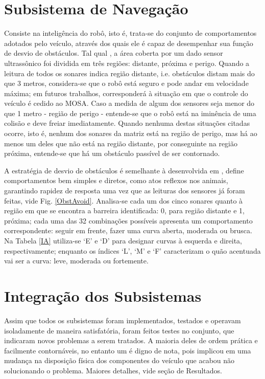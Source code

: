 \section{Subsistema de Navegação} %
Consiste na inteligência  do robô, isto é, trata-se do conjunto de comportamentos adotados pelo veículo, através dos quais ele é capaz de 
desempenhar sua função de desvio de obstáculos. %
Tal qual \cite{Artigo_3}, a área coberta por um dado sensor ultrassônico foi dividida em três regiões: distante, próxima e perigo.
Quando a leitura de todos os sonares indica região distante, i.e. obstáculos distam mais do que 3 metros, considera-se que o robô 
está seguro e pode andar em velocidade máxima; em futuros trabalhos, corresponderá à situação em que o controle do veículo é cedido ao MOSA.
Caso a medida de algum dos sensores seja menor do que 1 metro - região de perigo - entende-se que o robô está na iminência de uma colisão e deve 
freiar imediatamente.
Quando nenhuma destas situações citadas ocorre, isto é, nenhum dos sonares da matriz está na região de perigo, mas há ao menos um deles que não está 
na região distante, por conseguinte na região próxima, entende-se que há um obstáculo passível de ser contornado.

A estratégia de desvio de obstáculos é semelhante à desenvolvida em \cite{Artigo_1}, define comportamentos bem simples e diretos, como atos reflexos 
nos animais, garantindo rapidez de resposta uma vez que as leituras dos sensores já foram feitas, vide Fig. \ref{ObstAvoid}.
Analisa-se cada um dos cinco sonares quanto à região em que se encontra a barreira identificada: 0, para região distante e 1, próxima;
cada uma das 32 combinações possíveis apresenta um comportamento correspondente: seguir em frente, fazer uma curva aberta, moderada ou brusca.
Na Tabela \ref{IA} utiliza-se \textquoteleft E\textquoteright{} e  \textquoteleft D\textquoteright{} para designar curvas à esquerda e direita, 
respectivamente; enquanto os índices \textquoteleft L\textquoteright{},  \textquoteleft M\textquoteright{} e \textquoteleft F\textquoteright{} 
caracterizam o quão acentuada vai ser a curva: leve, moderada ou fortemente. %

\section{Integração dos Subsistemas}
Assim que todos os subsistemas foram implementados, testados e operavam isoladamente de maneira satisfatória, foram feitos testes no conjunto, que 
indicaram novos problemas a serem tratados. 
A maioria deles de ordem prática e facilmente contornáveis, no entanto um é digno de nota, pois implicou em uma mudança na disposição física dos 
componentes do veículo que acabou não solucionando o problema. Maiores detalhes, vide seção de Resultados.